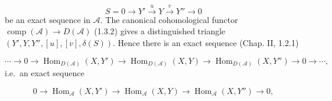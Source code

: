 \[
S=0\longrightarrow Y'\xrightarrow{u}Y\xrightarrow{v}Y''
\longrightarrow0
\]
be an exact sequence in $\mathcal A$. The canonical cohomological functor
$\operatorname{comp}(\mathcal A)\longrightarrow D(\mathcal A)$ (1.3.2)
gives a distinguished triangle $(Y',Y,Y'',[u],[v],\delta(S))$. Hence there
is an exact sequence (Chap. II, 1.2.1)

\[
\cdots\longrightarrow0\longrightarrow
\operatorname{Hom}_{D(\mathcal A)}(X,Y')\longrightarrow
\operatorname{Hom}_{D(\mathcal A)}(X,Y)\longrightarrow
\operatorname{Hom}_{D(\mathcal A)}(X,Y'')\longrightarrow0
\longrightarrow\cdots,
\]
i.e.\ an exact sequence

\[
0\longrightarrow\operatorname{Hom}_{\mathcal A}(X,Y')
\longrightarrow\operatorname{Hom}_{\mathcal A}(X,Y)
\longrightarrow\operatorname{Hom}_{\mathcal A}(X,Y'')
\longrightarrow0,
\]
\endgroup
